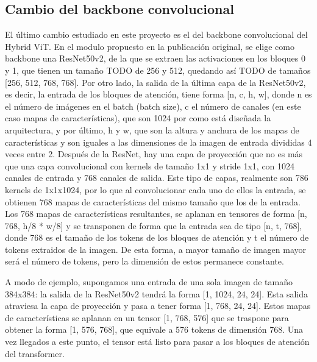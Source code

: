 \subsection{Cambio del backbone convolucional}
El último cambio estudiado en este proyecto es el del backbone convolucional del Hybrid ViT. En el modulo propuesto en la publicación original, se elige como backbone una ResNet50v2, de la que se extraen las activaciones en los bloques 0 y 1, que tienen un tamaño TODO de 256 y 512, quedando así TODO de tamaños [256, 512, 768, 768]. Por otro lado, la salida de la última capa de la ResNet50v2, es decir, la entrada de los bloques de atención, tiene forma [n, c, h, w], donde n es el número de imágenes en el batch (batch size), c el número de canales (en este caso mapas de características), que son 1024 por como está diseñada la arquitectura, y por último, h y w, que son la altura y anchura de los mapas de características y son iguales a las dimensiones de la imagen de entrada divididas 4 veces entre 2. Después de la ResNet, hay una capa de proyección que no es más que una capa convolucional con kernels de tamaño 1x1 y stride 1x1, con 1024 canales de entrada y 768 canales de salida. Este tipo de capas, realmente son 786 kernels de 1x1x1024, por lo que al convolucionar cada uno de ellos la entrada, se obtienen 768 mapas de características del mismo tamaño que los de la entrada. Los 768 mapas de características resultantes, se aplanan en tensores de forma [n, 768, h/8 * w/8] y se transponen de forma que la entrada sea de tipo [n, t, 768], donde 768 es el tamaño de los tokens de los bloques de atención y t el número de tokens extraidos de la imagen. De esta forma, a mayor tamaño de imagen mayor será el número de tokens, pero la dimensión de estos permanece constante.


A modo de ejemplo, supongamos una entrada de una sola imagen de tamaño 384x384: la salida de la ResNet50v2 tendrá la forma [1, 1024, 24, 24]. Esta salida atraviesa la capa de proyección y pasa a tener forma [1, 768, 24, 24]. Estos mapas de características se aplanan en un tensor [1, 768, 576] que se traspone para obtener la forma [1, 576, 768], que equivale a 576 tokens de dimensión 768. Una vez llegados a este punto, el tensor está listo para pasar a los bloques de atención del transformer.

